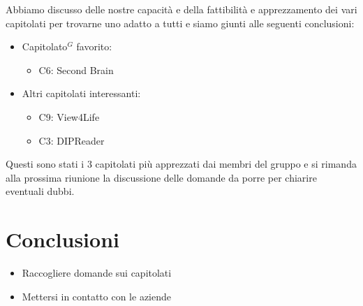 \documentclass[a4paper,10pt]{article}
\begin{document}
\vspace{1\baselineskip}

Abbiamo discusso delle nostre capacità e della fattibilità e apprezzamento dei vari capitolati per trovarne uno adatto a tutti e siamo giunti alle seguenti conclusioni:
\begin{itemize}
    \item  Capitolato$^G$ favorito:
    \begin{itemize}
        \item C6: Second Brain
    \end{itemize} 
    \item Altri capitolati interessanti:
    \begin{itemize}
        \item C9: View4Life
        \item C3: DIPReader
    \end{itemize}
\end{itemize}

Questi sono stati i 3 capitolati più apprezzati dai membri del gruppo e si rimanda alla prossima riunione la discussione delle domande da porre per chiarire eventuali dubbi.

\section*{Conclusioni}
\begin{itemize}
    \item Raccogliere domande sui capitolati
    \par
    \item Mettersi in contatto con le aziende
\end{itemize}
\end{document}
